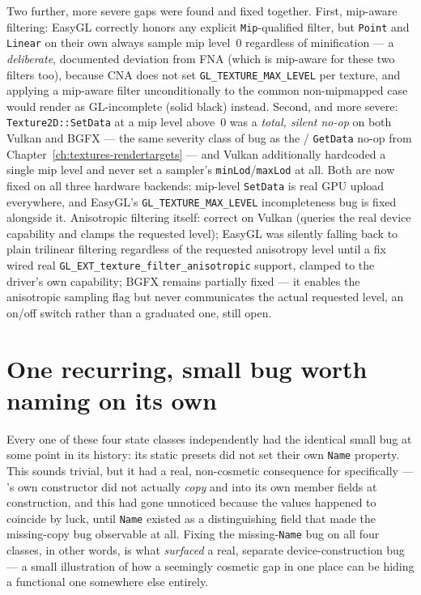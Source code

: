 Two further, more severe gaps were found and fixed together. First, mip-aware filtering:
EasyGL correctly honors any explicit \texttt{Mip}-qualified filter, but \texttt{Point} and
\texttt{Linear} on their own always sample mip level~0 regardless of minification --- a
\emph{deliberate}, documented deviation from FNA (which is mip-aware for these two filters
too), because CNA does not set \texttt{GL\_TEXTURE\_MAX\_LEVEL} per texture, and applying a
mip-aware filter unconditionally to the common non-mipmapped case would render as GL-incomplete
(solid black) instead. Second, and more severe: \texttt{Texture2D::SetData} at a mip level
above~0 was a \emph{total, silent no-op} on both Vulkan and BGFX --- the same severity class
of bug as the / \texttt{GetData} no-op from
Chapter~\ref{ch:textures-rendertargets} --- and Vulkan additionally hardcoded a single mip
level and never set a sampler's \texttt{minLod}/\texttt{maxLod} at all. Both are now fixed on
all three hardware backends: mip-level \texttt{SetData} is real GPU upload everywhere, and
EasyGL's \texttt{GL\_TEXTURE\_MAX\_LEVEL} incompleteness bug is fixed alongside it.
Anisotropic filtering itself: correct on Vulkan (queries the real device capability and
clamps the requested level); EasyGL was silently falling back to plain trilinear filtering
regardless of the requested anisotropy level until a fix wired real
\texttt{GL\_EXT\_texture\_filter\_anisotropic} support, clamped to the driver's own
capability; BGFX remains partially fixed --- it enables the anisotropic sampling flag but
never communicates the actual requested level, an on/off switch rather than a graduated one,
still open.

\section{One recurring, small bug worth naming on its own}

Every one of these four state classes independently had the identical small bug at some
point in its history: its static presets did not set their own \texttt{Name} property. This
sounds trivial, but it had a real, non-cosmetic consequence for 
specifically --- 's own constructor did not actually \emph{copy}
 and 
into its own member fields at construction, and this had gone unnoticed because the values
happened to coincide by luck, until \texttt{Name} existed as a distinguishing field that
made the missing-copy bug observable at all. Fixing the missing-\texttt{Name} bug on all four
classes, in other words, is what \emph{surfaced} a real, separate device-construction bug ---
a small illustration of how a seemingly cosmetic gap in one place can be hiding a functional
one somewhere else entirely.
